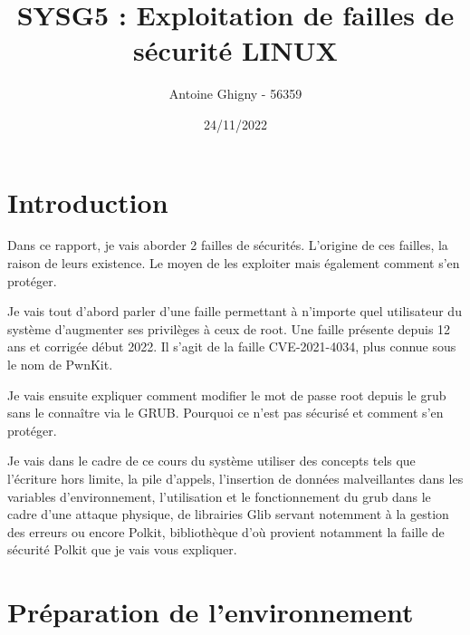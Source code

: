 \documentclass[12pt,a4paper]{article}
\title{SYSG5 : Exploitation de failles de sécurité LINUX}
\author{Antoine Ghigny - 56359}          \let\Author\@author
\date{24/11/2022}           \let\Date\@date
\begin{document}
\maketitle 
   \newpage
   \tableofcontents
   \section{Introduction}
   \begin{flushleft}
       \noindent Dans ce rapport, je vais aborder 2 failles de sécurités. L'origine de ces failles, la raison de leurs existence. Le moyen de les exploiter mais également comment s'en protéger.
       \item Je vais tout d'abord parler d'une faille permettant à n'importe quel utilisateur du système d'augmenter ses privilèges à ceux de root. Une faille présente depuis 12 ans et corrigée début 2022. Il s'agit de la faille CVE-2021-4034, plus connue sous le nom de PwnKit.
       \item Je vais ensuite expliquer comment modifier le mot de passe root depuis le grub sans le connaître via le GRUB. Pourquoi ce n'est pas sécurisé et comment s'en protéger. 
       \item Je vais dans le cadre de ce cours du système utiliser des concepts tels que l'écriture hors limite, la pile d'appels, l'insertion de données malveillantes dans les variables d'environnement, l'utilisation et le fonctionnement du grub dans le cadre d'une attaque physique, de librairies Glib servant notemment à la gestion des erreurs ou encore Polkit, bibliothèque d'où provient notamment la faille de sécurité Polkit que je vais vous expliquer.
   \end{flushleft}

   \section{Préparation de l'environnement}
\end{document}
